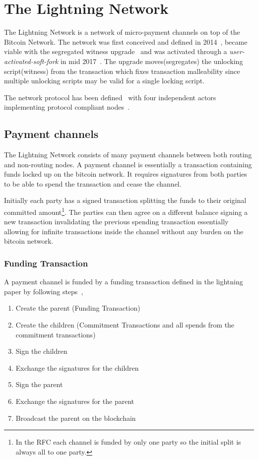 \chapter{The Lightning Network}
\label{sec:lightning:network}

The \gls{Lightning Network} is a network of micro-payment \gls{channel}s on top of the Bitcoin Network. The network was first conceived and defined in 2014~\cite{poon:dryja:lightning:network}, became viable with the segregated witness upgrade~\cite{bip:0141:segwit} and was activated through a \textit{user-activated-soft-fork} in mid 2017~\cite{bip:148:uasf:segwit}. The upgrade moves(segregates) the unlocking script(witness) from the transaction which fixes transaction malleability since multiple unlocking scripts may be valid for a single locking script. 

The network protocol has been defined~\cite{repository:lightning:rfc} with four independent actors implementing protocol compliant nodes~\cite{repository:lnd, repository:eclair, repository:clightning, repository:lit}.

\section{Payment channels}

The Lightning Network consists of many payment channels between both routing and non-routing \gls{node}s.
A payment channel is essentially a transaction containing funds locked up on the bitcoin network. It requires signatures from both parties to be able to spend the transaction and cease the channel.

Initially each party has a signed transaction splitting the funds to their original committed amount\footnote{In the RFC each channel is funded by only one party so the initial split is always all to one party.}. The parties can then agree on a different balance signing a new transaction invalidating the previous spending transaction essentially allowing for infinite transactions inside the channel without any burden on the bitcoin network.

\subsection{Funding Transaction}

A payment channel is funded by a funding transaction defined in the lightning paper by following steps~\cite{poon:dryja:lightning:network},

\begin{enumerate}
	\item  Create the parent (Funding Transaction)
	\item  Create the children (Commitment Transactions and all spends from the commitment transactions)
	\item  Sign the children
	\item  Exchange the signatures for the children
	\item  Sign the parent
	\item  Exchange the signatures for the parent
	\item  Broadcast the parent on the blockchain
\end{enumerate}

